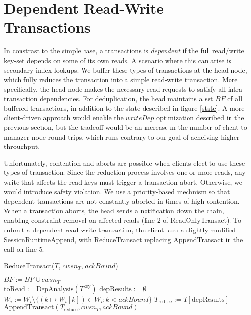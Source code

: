 \documentclass{article}
\begin{document}
\section{Dependent Read-Write Transactions} \label{deptxn}
In constrast to the simple case, a transactions is \emph{dependent} if the full read/write key-set depends on some of its own reads. A scenario where this can arise is secondary index lookups. We buffer these types of transactions at the head node, which fully reduces the transaction into a simple read-write transaction. More specifically, the head node makes the necessary read requests to satisfy all intra-transaction dependencies. For deduplication, the head maintains a set $BF$ of all buffered transactions, in addition to the state described in figure \ref{state}. A more client-driven approach would enable the $writeDep$ optimization described in the previous section, but the tradeoff would be an increase in the number of client to manager node round trips, which runs contrary to our goal of acheiving higher throughput.
\par Unfortunately, contention and aborts are possible when clients elect to use these types of transaction. Since the reduction process involves one or more reads, any write that affects the read keys must trigger a transaction abort. Otherwise, we would introduce safety violation. We use a priority-based mechnism so that dependent transactions are not constantly aborted in times of high contention. When a transaction aborts, the head sends a notification down the chain, enabling constraint removal on affected reads (line 2 of ReadOnlyTransact). To submit a dependent read-write transaction, the client uses a slightly modified SessionRuntimeAppend, with ReduceTransact replacing AppendTransact in the call on line 5. \\
\begin{procedure}[H]
  \caption{ReduceTransact($T$, $cwsn_T$, $ackBound$)}
  $BF := BF \cup {cwsn_T}$\\
  $\text{toRead} := \text{DepAnalysis}(T^{\text{key}})$ 
  $\text{depResults} := \emptyset$\\
  $W_i := W_i \setminus \{ (k \mapsto W_i[k]) \in W_i : k < ackBound\}$   
  $T_{\text{reduce}} := T[\text{depResults}]$ 
  $\text{AppendTransact}(T_{\text{reduce}}, cwsn_T, ackBound)$
\end{procedure}
\end{document}
